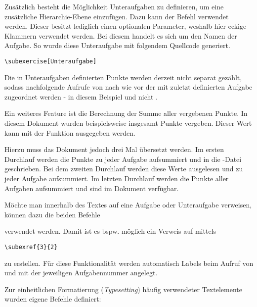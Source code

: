 \documentclass[a4paper,12pt]{article}
\begin{document}
\subexercise[Unteraufgaben]
Zusätzlich besteht die Möglichkeit Unteraufgaben zu definieren, um eine zusätzliche Hierarchie-Ebene einzufügen. Dazu kann der Befehl \tsetprog{\subexercise[<name>]} verwendet werden. Dieser besitzt lediglich einen optionalen Parameter, weshalb hier eckige Klammern verwendet werden. Bei diesem handelt es sich um den Namen der Aufgabe. So wurde diese Unteraufgabe mit folgendem Quellcode generiert.
\begin{verbatim}
\subexercise[Unteraufgabe]
\end{verbatim}
Die in Unteraufgaben definierten Punkte werden derzeit nicht separat gezählt, sodass nachfolgende Aufrufe von \tsetprog{\addpoints}nach wie vor der mit \tsetprog{\exercise}zuletzt definierten Aufgabe zugeordnet werden - in diesem Beispiel  und nicht .

\subexercise
Ein weiteres Feature ist die Berechnung der Summe aller vergebenen Punkte. In diesem Dokument wurden beispielsweise insgesamt \printexpoints Punkte vergeben. Dieser Wert kann mit der Funktion \tsetprog{\printexpoints}ausgegeben werden.

Hierzu muss das Dokument jedoch drei Mal übersetzt werden. Im ersten Durchlauf werden die Punkte zu jeder Aufgabe aufsummiert und in die -Datei geschrieben. Bei dem zweiten Durchlauf werden diese Werte ausgelesen und zu jeder Aufgabe aufsummiert. Im letzten Durchlauf werden die Punkte aller Aufgaben aufsummiert und sind im Dokument verfügbar. 

Möchte man innerhalb des Textes auf eine Aufgabe oder Unteraufgabe verweisen, können dazu die beiden Befehle 
\begin{enumerate}
\end{enumerate}
verwendet werden. Damit ist es bspw. möglich ein Verweis auf  mittels
\begin{verbatim}
\subexref{3}{2}
\end{verbatim}
zu erstellen. Für diese Funktionalität werden automatisch Labels beim Aufruf von \tsetprog{\exercise}und \tsetprog{\subexercise}mit der jeweiligen Aufgabennummer angelegt.

Zur einheitlichen Formatierung (\emph{Typesetting}) häufig verwendeter Textelemente wurden eigene Befehle definiert:
\end{document}
